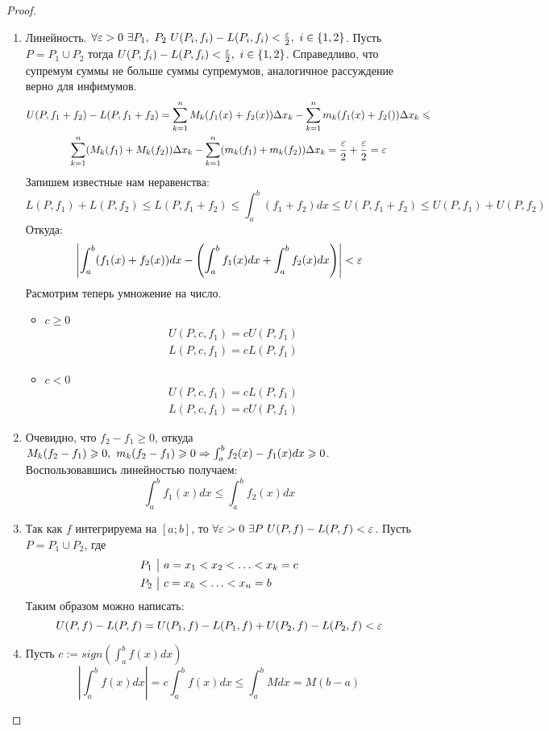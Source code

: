 \begin{proof}~
	\begin{enumerate}
		\item Линейность. $\forall \eps > 0\ \exists P_1,\ P_2\ U(P_i, f_i) - L(P_i, f_i) < \frac{\eps}{2},\ i \in \{1, 2\}$.
		Пусть $P = P_1 \cup P_2$ тогда $U(P, f_i) - L(P, f_i) < \frac{\varepsilon}{2},\ i \in \{1, 2\}$.
		Справедливо, что супремум суммы не больше суммы супремумов, аналогичное рассуждение верно для инфимумов.
		\begin{multline*}
			U(P, f_1 + f_2) - L(P, f_1 + f_2) = \sum\limits_{k = 1}^nM_k(f_1(x) + f_2(x))\Delta x_k - \sum\limits_{k = 1}^nm_k(f_1(x) + f_2())\Delta x_k \leqslant
			\\
			\sum\limits_{k = 1}^n(M_k(f_1) + M_k(f_2))\Delta x_k - \sum\limits_{k = 1}^n(m_k(f_1) + m_k(f_2))\Delta x_k = \frac{\varepsilon}{2} + \frac{\varepsilon}{2} = \varepsilon
		\end{multline*}
		Запишем известные нам неравенства:
		\[
			L(P, f_1) + L(P, f_2) \leq L(P, f_1 + f_2) \leq \int_{a}^{b}(f_1 + f_2)dx \leq U(P, f_1 + f_2) \leq U(P, f_1) + U(P, f_2)
		\]
		Откуда:
		\[
			\left|\int_a^b(f_1(x) + f_2(x))dx - \left(\int_a^bf_1(x)dx + \int_a^bf_2(x)dx\right)\right| < \varepsilon
		\]
		Расмотрим теперь умножение на число.
		\begin{itemize}
			\item $c \geq 0$
				\begin{align*}
					& U(P, c, f_1) = cU(P, f_1)
					\\
					& L(P, c, f_1) = cL(P, f_1)
				\end{align*}
			\item $c < 0$
				\begin{align*}
					& U(P, c, f_1) = cL(P, f_1)
					\\
					& L(P, c, f_1) = cU(P, f_1)
				\end{align*}
		\end{itemize}
		\item Очевидно, что $f_2 - f_1 \geq 0$, откуда $M_k(f_2 - f_1) \geqslant 0,\ m_k(f_2 - f_1) \geqslant 0 \Rightarrow \int_a^bf_2(x)-f_1(x)dx \geqslant 0$.
		Воспользовавшись линейностью получаем:
		\[
			\int_a^bf_1(x)dx \leq \int_a^bf_2(x)dx
		\]
		
		\item Так как $f$ интегрируема на $[a;b]$, то $\forall\varepsilon > 0\ \exists P\ U(P, f) - L(P, f) < \varepsilon$.
		Пусть $P = P_1 \cup P_2$, где 
		\begin{align*}
			&P_1\ \big|\  a = x_1 < x_2 < \ldots < x_k = c
			\\
			&P_2\ \big|\  c = x_k < \ldots < x_n = b
		\end{align*}
		Таким образом можно написать:
		\[
			U(P, f) - L(P, f) = U(P_1, f) - L(P_1, f) + U(P_2, f) - L(P_2, f) < \varepsilon
		\]
		\item Пусть $c := sign\left(\int_a^bf(x)dx\right)$
		\[
			\left|\int_a^bf(x)dx\right| = c \int_a^bf(x)dx \leq \int_a^bMdx  = M(b - a)
		\]
	\end{enumerate}
\end{proof}

